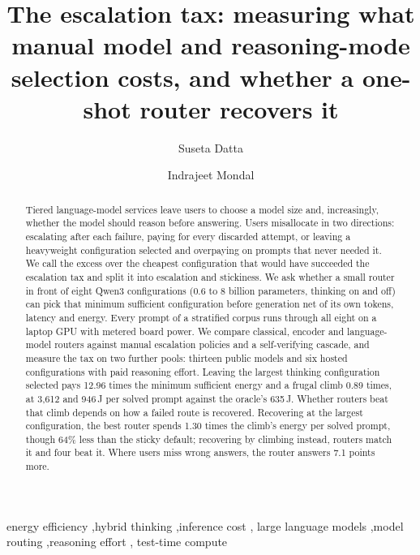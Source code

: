 \documentclass[final,5p,times,twocolumn]{elsarticle}
\theoremstyle{plain}
\begin{document}
\begin{frontmatter}

\title{The escalation tax: measuring what manual model and
reasoning-mode selection costs, and whether a one-shot router recovers it}

\author[a]{Suseta Datta}
\author[a]{Indrajeet Mondal}


\begin{abstract}
Tiered language-model services leave users to choose a model size and,
increasingly, whether the model should reason before answering. Users
misallocate in two directions: escalating after each failure, paying for
every discarded attempt, or leaving a heavyweight configuration selected and
overpaying on prompts that never needed it. We call the excess over the
cheapest configuration that would have succeeded the escalation tax and
split it into escalation and stickiness. We ask whether a small router in
front of eight Qwen3 configurations (0.6 to 8 billion parameters, thinking
on and off) can pick that minimum sufficient configuration before generation
net of its own tokens, latency and energy. Every prompt of a
stratified corpus runs through all eight on a laptop GPU with metered board
power. We compare classical, encoder and language-model routers against
manual escalation policies and a self-verifying cascade, and measure the tax
on two further pools: thirteen public models and six hosted configurations
with paid reasoning effort. Leaving the largest thinking configuration
selected pays 12.96 times the minimum sufficient energy and a frugal climb
0.89 times, at 3{,}612 and 946\,J per solved prompt against the oracle's
635\,J. Whether routers beat that climb depends on how a failed route is
recovered. Recovering at the largest configuration, the best router spends
1.30 times the climb's energy per solved prompt, though 64\% less than the
sticky default; recovering by climbing instead, routers match it and four
beat it. Where users miss wrong answers, the router answers 7.1 points more.
\end{abstract}

\begin{keyword}
energy efficiency \sep hybrid thinking \sep inference cost \sep
large language models \sep model routing \sep reasoning effort \sep
test-time compute
\end{keyword}

\end{frontmatter}
\end{document}
